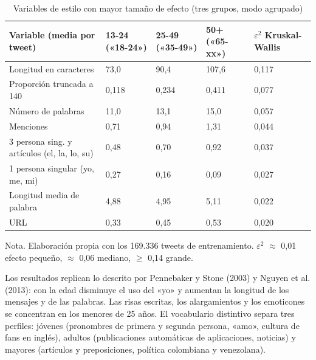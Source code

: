 \documentclass[10pt,twocolumn]{article}
\begin{document}
\begin{table}[!t]
\centering\footnotesize
\caption{Variables de estilo con mayor tamaño de efecto (tres grupos, modo agrupado)}\label{tab:2}
\renewcommand{\arraystretch}{1.15}
\begin{tabular}{p{}p{}p{}p{}p{}}
\hline
\raggedright\textbf{Variable (media por tweet)} & \raggedright\textbf{13-24 («18-24»)} & \raggedright\textbf{25-49 («35-49»)} & \raggedright\textbf{50+ («65-xx»)} & \raggedright\textbf{$\varepsilon^2$ Kruskal-Wallis} \tabularnewline \hline
\raggedright Longitud en caracteres & \raggedright 73,0 & \raggedright 90,4 & \raggedright 107,6 & \raggedright 0,117 \tabularnewline
\raggedright Proporción truncada a 140 & \raggedright 0,118 & \raggedright 0,234 & \raggedright 0,411 & \raggedright 0,077 \tabularnewline
\raggedright Número de palabras & \raggedright 11,0 & \raggedright 13,1 & \raggedright 15,0 & \raggedright 0,057 \tabularnewline
\raggedright Menciones & \raggedright 0,71 & \raggedright 0,94 & \raggedright 1,31 & \raggedright 0,044 \tabularnewline
\raggedright 3\textordfeminine{} persona sing. y artículos (el, la, lo, su) & \raggedright 0,48 & \raggedright 0,70 & \raggedright 0,92 & \raggedright 0,037 \tabularnewline
\raggedright 1\textordfeminine{} persona singular (yo, me, mi) & \raggedright 0,27 & \raggedright 0,16 & \raggedright 0,09 & \raggedright 0,027 \tabularnewline
\raggedright Longitud media de palabra & \raggedright 4,88 & \raggedright 4,95 & \raggedright 5,11 & \raggedright 0,022 \tabularnewline
\raggedright URL & \raggedright 0,33 & \raggedright 0,45 & \raggedright 0,53 & \raggedright 0,020 \tabularnewline
\hline
\end{tabular}
\par\smallskip\raggedright\scriptsize Nota. Elaboración propia con los 169.336 tweets de entrenamiento. $\varepsilon^2$ $\approx$ 0,01 efecto pequeño, $\approx$ 0,06 mediano, $\geq$ 0,14 grande.
\end{table}

Los resultados replican lo descrito por Pennebaker y Stone (2003) y Nguyen et al. (2013): con la edad disminuye el uso del «yo» y aumentan la longitud de los mensajes y de las palabras. Las risas escritas, los alargamientos y los emoticones se concentran en los menores de 25 años. El vocabulario distintivo separa tres perfiles: jóvenes (pronombres de primera y segunda persona, «amo», cultura de fans en inglés), adultos (publicaciones automáticas de aplicaciones, noticias) y mayores (artículos y preposiciones, política colombiana y venezolana).
\end{document}
